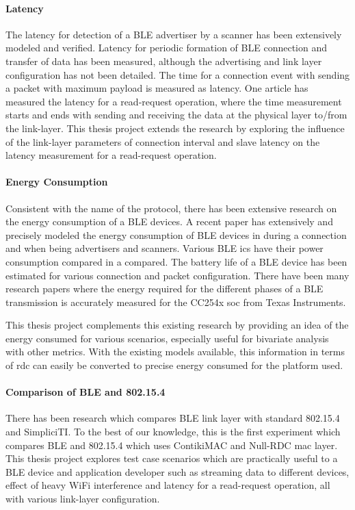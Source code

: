 \paragraph{Latency}
The latency for detection of a BLE advertiser by a scanner has been extensively modeled and verified\cite{Kindt2014}\cite{Liu2012}. Latency for periodic formation of BLE connection and transfer of data has been measured\cite{Dementyev2013}, although the advertising and link layer configuration has not been detailed. The time for a connection event with sending a packet with maximum payload is measured as latency\cite{Gomez2012}. One article has measured the latency for a read-request operation, where the time measurement starts and ends with sending and receiving the data at the physical layer to/from the link-layer\cite{Mikhaylov2013}. This thesis project extends the research by exploring the influence of the link-layer parameters of connection interval and slave latency on the latency measurement for a read-request operation.

\paragraph{Energy Consumption}
Consistent with the name of the protocol, there has been extensive research on the energy consumption of a BLE devices. A recent paper has extensively and precisely modeled the energy consumption of BLE devices in during a connection and when being advertisers and scanners\cite{Kindt2014}. Various BLE \glspl{ic} have their power consumption compared in a compared\cite{Bernegger2014}. The battery life of a BLE device has been estimated for various connection and packet configuration\cite{Gomez2012}. There have been many research papers where the energy required for the different phases of a BLE transmission is accurately measured\cite{Mikhaylov2013}\cite{Siekkinen2012}\cite{Mackensen2012}\cite{liu2012energy} for the CC254x \gls{soc} from Texas Instruments.

This thesis project complements this existing research by providing an idea of the energy consumed for various scenarios, especially useful for bivariate analysis with other metrics. With the existing models available, this information in terms of \gls{rdc} can easily be converted to precise energy consumed for the platform used.

\paragraph{Comparison of BLE and 802.15.4} There has been research which compares BLE link layer with standard 802.15.4\cite{Mikhaylov2013}\cite{Siekkinen2012} and  SimpliciTI\cite{Mikhaylov2013}. To the best of our knowledge, this is the first experiment which compares BLE and 802.15.4 which uses ContikiMAC and Null-RDC \gls{mac} layer. This thesis project explores test case scenarios which are practically useful to a BLE device and application developer such as streaming data to different devices, effect of heavy WiFi interference and latency for a read-request operation, all with various link-layer configuration. 